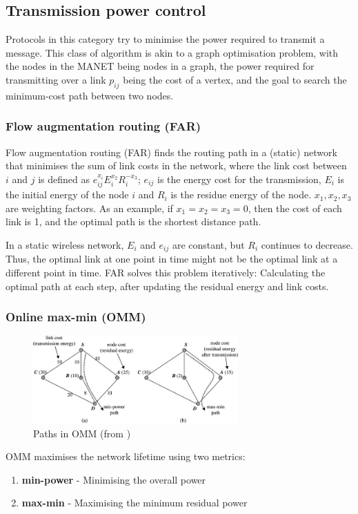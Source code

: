 \subsection{Transmission power control}
Protocols in this category try to minimise the power required to transmit
a message. This class of algorithm is akin to a graph optimisation problem,
with the nodes in the MANET being nodes in a graph, the power required for
transmitting over a link $p_{ij}$ being the cost of a vertex, and the goal
to search the minimum-cost path between two nodes.

\subsubsection{Flow augmentation routing (FAR)}
Flow augmentation routing (FAR)\cite{chang2000energy} finds the routing
path in a (static) network that minimises the sum of link costs in the network,
where the link cost between $i$ and $j$ is defined as \( e_{ij}^{x_{i}}E_{i}^{x_{2}}R_{i}^{-x_{3}}\);
\(e_{ij}\) is the energy cost for the transmission, $E_{i}$ is the initial energy
of the node $i$ and $R_{i}$ is the residue energy of the node. \(x_{1}, x_{2}, x_{3}\)
are weighting factors. As an example, if $x_{1}=x_{2}=x_{3}=0$, then the cost
of each link is 1, and the optimal path is the shortest distance path.

In a static wireless network, $E_{i}$ and $e_{ij}$ are constant, but $R_{i}$
continues to decrease. Thus, the optimal link at one point in time might not be the
optimal link at a different point in time. FAR solves this problem iteratively:
Calculating the optimal path at each step, after updating the residual energy
and link costs.

\subsubsection{Online max-min (OMM)}
\begin{figure}
\centering
\includegraphics[width=0.7\textwidth]{images/omm}
\caption{Paths in OMM (from \cite{alotaibi2012survey})}
\label{ommex}
\end{figure}
\label{omm}
OMM \cite{li2001online} maximises the network lifetime using two metrics:
\begin{enumerate}
  \item \textbf{min-power} - Minimising the overall power
  \item \textbf{max-min} - Maximising the minimum residual power
\end{enumerate}

